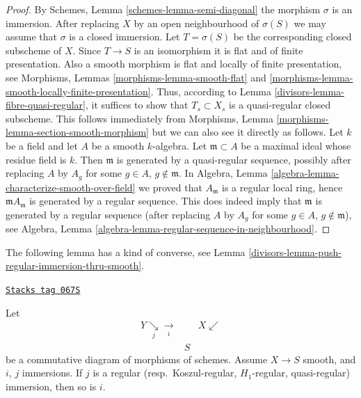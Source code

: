 \begin{proof}

By
Schemes, Lemma \ref{schemes-lemma-semi-diagonal}
the morphism $\sigma$ is an immersion.
After replacing $X$ by an open neighbourhood of $\sigma(S)$
we may assume that $\sigma$ is a closed immersion.
Let $T = \sigma(S)$ be the corresponding closed subscheme of $X$.
Since $T \to S$ is an isomorphism it is flat and of finite presentation.
Also a smooth morphism is flat and locally of finite presentation, see
Morphisms, Lemmas \ref{morphisms-lemma-smooth-flat} and
\ref{morphisms-lemma-smooth-locally-finite-presentation}.
Thus, according to
Lemma \ref{divisors-lemma-fibre-quasi-regular},
it suffices to show that $T_s \subset X_s$ is a quasi-regular closed
subscheme. This follows immediately from
Morphisms, Lemma \ref{morphisms-lemma-section-smooth-morphism}
but we can also see it directly as follows.
Let $k$ be a field and let $A$ be a smooth $k$-algebra.
Let $\mathfrak m \subset A$ be a maximal ideal whose residue field is $k$.
Then $\mathfrak m$ is generated by a quasi-regular sequence, possibly
after replacing $A$ by $A_g$ for some $g \in A$, $g \not \in \mathfrak m$.
In
Algebra, Lemma \ref{algebra-lemma-characterize-smooth-over-field}
we proved that $A_{\mathfrak m}$ is a regular local ring,
hence $\mathfrak mA_{\mathfrak m}$ is generated by a regular sequence.
This does indeed imply that $\mathfrak m$ is generated by a
regular sequence (after replacing $A$ by $A_g$ for some $g \in A$,
$g \not \in \mathfrak m$), see
Algebra, Lemma \ref{algebra-lemma-regular-sequence-in-neighbourhood}.
\end{proof}

The following lemma has a kind of converse, see
Lemma \ref{divisors-lemma-push-regular-immersion-thru-smooth}.

\begin{lemma}
\label{divisors-lemma-lift-regular-immersion-to-smooth}
\href{https://stacks.math.columbia.edu/tag/067S}{\texttt{Stacks tag 067S}}

Let
$$
\begin{array}{ccc}Y \underset{j}{\searrow}\underset{i}{\longrightarrow} &  & X \swarrow \\  & S & \end{array}
$$
be a commutative diagram of morphisms of schemes.
Assume $X \to S$ smooth, and $i$, $j$ immersions.
If $j$ is a regular (resp.\ Koszul-regular, $H_1$-regular, quasi-regular)
immersion, then so is $i$.
\end{lemma}

